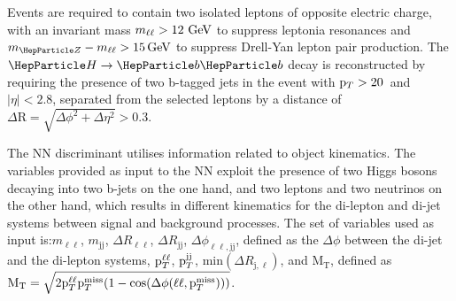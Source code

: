 Events are required to contain two isolated leptons of opposite electric charge, with an invariant mass $m_{\ell\ell} > 12
~\text{GeV}$ to suppress leptonia resonances and $m_{\PZ} - m_{\ell\ell} > 15\GeV$ to suppress Drell-Yan lepton pair production.
The $\PH\to\PQb\PQb$ decay is reconstructed by requiring the presence of two b-tagged jets in the event with $\mathrm{p}_{T} > 20$~\UGeV and $| \eta | < 2.8$, separated from the selected leptons by a distance of $\Delta \text{R} = \sqrt{\Delta \phi^2 + \Delta \eta^2} > 0.3$.




The NN discriminant utilises information related
to object kinematics.
The variables provided as input to the NN exploit the presence of two Higgs  bosons decaying into two b-jets on the one hand, and two leptons and two neutrinos on the other hand, 
which results in different kinematics for the di-lepton and di-jet systems between signal and 
background processes.
The set of variables used as input is:$ m_{\ell\ell}$, $m_\text{jj}$,
$\Delta R_{\ell\ell}$, $\Delta R_{\text{j}\text{j}}$, $\Delta \phi_{\ell\ell, \text{j}\text{j}}$, defined as 
the $\Delta \phi$ between the di-jet and the di-lepton systems, $\mathrm{p}_{T}^{\ell\ell}$, $\mathrm{p}_{T}^{\text{j}\text{j}}$,
min$\left(\Delta R_{\text{j}, \ell}\right)$, and $\mathrm{M}_\mathrm{T}$, defined as
$\mathrm{M}_\mathrm{T} = \sqrt{2 \mathrm{p}_{T}^{\ell\ell} \mathrm{p}_{T}^\text{miss} (1 - \cos(\Delta \phi(\ell\ell, \mathrm{p}_{T}^\text{miss})))}$.

